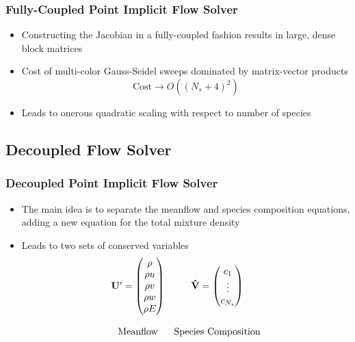 \documentclass{beamer}
\begin{document}
\begin{frame}
  \frametitle{Fully-Coupled Point Implicit Flow Solver}
  \begin{itemize}
    \item Constructing the Jacobian in a fully-coupled fashion results in large,
      dense block matrices
    \item Cost of multi-color Gauss-Seidel sweeps dominated by matrix-vector
      products 
      \[
        \text{Cost} \to O((N_s + 4)^2)
      \]
    \item Leads to onerous quadratic scaling with respect to number of species
  \end{itemize}
\end{frame}

\subsection{Decoupled Flow Solver}

\begin{frame}
  \frametitle{Decoupled Point Implicit Flow Solver}
  \begin{itemize}
    \item The main idea is to separate the meanflow and species composition
      equations, adding a new equation for the total mixture density
    \item Leads to two sets of conserved variables
      \begin{equation*}
      	\begin{matrix}
      		\mathbf{U}' =\begin{pmatrix}
      			\rho \\
      			\rho u \\
      			\rho v \\
      			\rho w \\
      			\rho E
      		\end{pmatrix} &
      		\mathbf{\hat{V}} = \begin{pmatrix}
      			c_1 \\
      			\vdots \\
      			c_{N_s}
      		\end{pmatrix} \\ \\
          \text{Meanflow} & \text{Species Composition}
      	\end{matrix} 
      \end{equation*}
  \end{itemize}
\end{frame}
\end{document}
